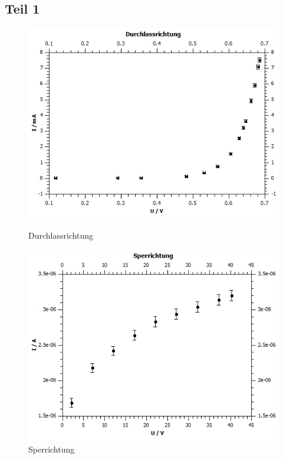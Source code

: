 \documentclass[12pt,a4paper,twoside]{article}
\begin{document}
\subsection{Teil 1}
\begin{figure}[H]
    \begin{minipage}[b]{.5\linewidth} %
        \includegraphics[width=1\linewidth]{nudes/1a plot.jpg}
        \caption{Durchlassrichtung}
    \end{minipage}
    \hspace{0.01\linewidth}%
    \begin{minipage}[b]{.5\linewidth} %
        \includegraphics[width=1\linewidth]{nudes/1b plot.jpg}
    \caption{Sperrichtung}
    \end{minipage}
\end{figure}
\end{document}
